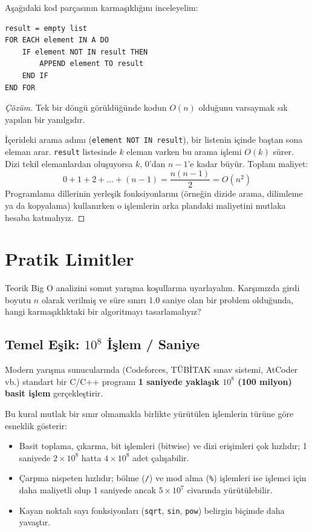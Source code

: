 \begin{example}
Aşağıdaki kod parçasının karmaşıklığını inceleyelim:

\begin{lstlisting}
result = empty list
FOR EACH element IN A DO
    IF element NOT IN result THEN
        APPEND element TO result
    END IF
END FOR\end{lstlisting}
\end{example}

\begin{proof}[Çözüm]
Tek bir döngü görüldüğünde kodun $O(n)$ olduğunu varsaymak sık yapılan bir yanılgıdır.

İçerideki arama adımı (\texttt{element NOT IN result}), bir listenin içinde baştan sona eleman arar. \texttt{result} listesinde $k$ eleman varken bu arama işlemi $O(k)$ sürer. Dizi tekil elemanlardan oluşuyorsa $k$, $0$'dan $n-1$'e kadar büyür. 
Toplam maliyet:
\[ 0 + 1 + 2 + \dots + (n-1) = \frac{n(n-1)}{2} = O(n^2) \]
Programlama dillerinin yerleşik fonksiyonlarını (örneğin dizide arama, dilimleme ya da kopyalama) kullanırken o işlemlerin arka plandaki maliyetini mutlaka hesaba katmalıyız.
\end{proof}

\section{Pratik Limitler}

Teorik Big O analizini somut yarışma koşullarına uyarlayalım. Karşımızda girdi boyutu $n$ olarak verilmiş ve süre sınırı 1.0 saniye olan bir problem olduğunda, hangi karmaşıklıktaki bir algoritmayı tasarlamalıyız?

\subsection{Temel Eşik: $10^8$ İşlem / Saniye}

\begin{definition}[$10^8$ Kuralı]
Modern yarışma sunucularında (Codeforces, TÜBİTAK sınav sistemi, AtCoder vb.) standart bir C/C++ programı \textbf{1 saniyede yaklaşık $10^8$ (100 milyon) basit işlem} gerçekleştirir.
\end{definition}

Bu kural mutlak bir sınır olmamakla birlikte yürütülen işlemlerin türüne göre esneklik gösterir:
\begin{itemize}
    \item Basit toplama, çıkarma, bit işlemleri (bitwise) ve dizi erişimleri çok hızlıdır; 1 saniyede $2 \times 10^8$ hatta $4 \times 10^8$ adet çalışabilir.
    \item Çarpma nispeten hızlıdır; bölme (\texttt{/}) ve mod alma (\texttt{\%}) işlemleri ise işlemci için daha maliyetli olup 1 saniyede ancak $5 \times 10^7$ civarında yürütülebilir.
    \item Kayan noktalı sayı fonksiyonları (\texttt{sqrt}, \texttt{sin}, \texttt{pow}) belirgin biçimde daha yavaştır.
\end{itemize}

